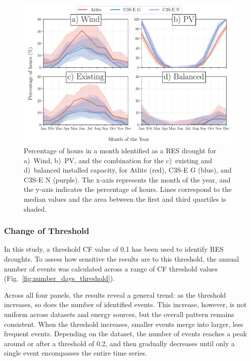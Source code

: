 \documentclass[a4paper, 11pt]{article}
\begin{document}
\begin{figure}[!ht]
	\centering
	\includegraphics[width=\textwidth]{droughts_seasonality}
	\caption{Percentage of hours in a month identified as a RES drought for a)~Wind, b)~PV, and the combination for the c)~existing and d)~balanced installed capacity, for Atlite (red), C3S-E G (blue), and C3S-E N (purple). The x-axis represents the month of the year, and the y-axis indicates the percentage of hours. Lines correspond to the median values and the area between the first and third quartiles is shaded.}
	\label{fig:res_droughts_seasonality}
\end{figure}

\newpage
\subsubsection{Change of Threshold}

In this study, a threshold CF value of 0.1 has been used to identify RES droughts. To assess how sensitive the results are to this threshold, the annual number of events was calculated across a range of CF threshold values (Fig.~\ref{fig:number_days_threshold}).

Across all four panels, the results reveal a general trend: as the threshold increases, so does the number of identified events. This increase, however, is not uniform across datasets and energy sources, but the overall pattern remains consistent. When the threshold increases, smaller events merge into larger, less frequent events. Depending on the dataset, the number of events reaches a peak around or after a threshold of 0.2, and then gradually decreases until only a single event encompasses the entire time series.
\end{document}
